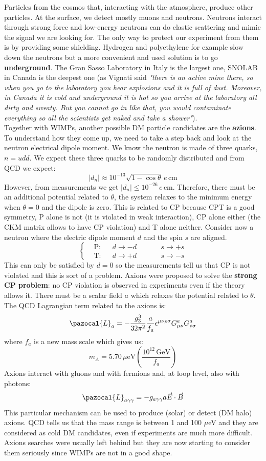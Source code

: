 \documentclass[10.75pt,a4paper,openright,bottom=2cm]{article}
\begin{document}
Particles from the cosmos that, interacting with the atmosphere, produce other particles. At the surface, we detect mostly muons and neutrons. Neutrons interact through strong force and low-energy neutrons can do elastic scattering and mimic the signal we are looking for. The only way to protect our experiment from them is by providing some shielding. Hydrogen and polyethylene for example slow down the neutrons but a more convenient and used solution is to go \textbf{underground}. The Gran Sasso Laboratory in Italy is the largest one, SNOLAB in Canada is the deepest one (as Vignati said \textit{"there is an active mine there, so when you go to the laboratory you hear explosions and it is full of dust. Moreover, in Canada it is cold and underground it is hot so you arrive at the laboratory all dirty and sweaty. But you cannot go in like that, you would contaminate everything so all the scientists get naked and take a shower"}).\\
Together with WIMPs, another possible DM particle candidates are the \textbf{azions}. To understand how they come up, we need to take a step back and look at the neutron electrical dipole moment. We know the neutron is made of three quarks, $n=udd$. We expect these three quarks to be randomly distributed and from QCD we expect:
\[
|d_n|\approx10^{-13}\sqrt{1-\cos\theta}\,e\,\text{cm}
\]
However, from measurements we get $|d_n|\le10^{-26}\,e$\,cm. Therefore, there must be an additional potential related to $\theta$, the system relaxes to the minimum energy when $\theta=0$ and the dipole is zero. This is related to CP because CPT is a good symmetry, P alone is not (it is violated in weak interaction), CP alone either (the CKM matrix allows to have CP violation) and T alone neither. Consider now a neutron where the electric dipole moment $d$ and the spin $s$ are aligned.
\[
\left\{
\begin{aligned}
&\text{P}:&&d\to-d \quad &&&s\to+s\\
&\text{T}:&&d\to+d \quad &&&s\to-s
\end{aligned}
\right.
\]
This can only be satisfied by $d=0$ so the measurements tell us that CP is not violated and this is sort of a problem. Axions were proposed to solve the \textbf{strong CP problem}: no CP violation is observed in experiments even if the theory allows it. There must be a scalar field $a$ which relaxes the potential related to $\theta$. The QCD Lagrangian term related to the axions is:
\[
\pazocal{L}_a=-\frac{g_3^3}{32\pi^2}\frac{a}{f_a}\epsilon^{\mu\nu\rho\sigma}G_{\mu\nu}^aG_{\rho\sigma}^a
\]
where $f_a$ is a new mass scale which gives us:
\[
m_A=5.70\,\text{$\mu$eV}\left(\frac{10^{12}\,\text{GeV}}{f_a}\right)
\]
Axions interact with gluons and with fermions and, at loop level, also with photons:
\[
\pazocal{L}_{a\gamma\gamma}=-g_{a\gamma\gamma}a\Vec{E}\cdot\Vec{B}
\]
This particular mechanism can be used to produce (solar) or detect (DM halo) axions. QCD tells us that the mass range is between 1 and 100 $\mu$eV and they are considered as cold DM candidates, even if experiments are much more difficult. Axions searches were usually left behind but they are now starting to consider them seriously since WIMPs are not in a good shape.
\end{document}
